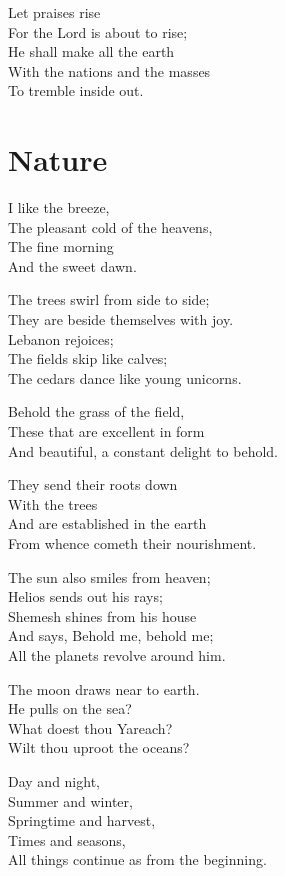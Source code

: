 \documentclass[
]{book}
\begin{document}
Let praises rise\\
For the Lord is about to rise;\\
He shall make all the earth\\
With the nations and the masses\\
To tremble inside out.

\chapter{Nature}\label{nature}

I like the breeze,\\
The pleasant cold of the heavens,\\
The fine morning\\
And the sweet dawn.

The trees swirl from side to side;\\
They are beside themselves with joy.\\
Lebanon rejoices;\\
The fields skip like calves;\\
The cedars dance like young unicorns.

Behold the grass of the field,\\
These that are excellent in form\\
And beautiful, a constant delight to behold.

They send their roots down\\
With the trees\\
And are established in the earth\\
From whence cometh their nourishment.

The sun also smiles from heaven;\\
Helios sends out his rays;\\
Shemesh shines from his house\\
And says, Behold me, behold me;\\
All the planets revolve around him.

The moon draws near to earth.\\
He pulls on the sea?\\
What doest thou Yareach?\\
Wilt thou uproot the oceans?

Day and night,\\
Summer and winter,\\
Springtime and harvest,\\
Times and seasons,\\
All things continue as from the beginning.
\end{document}
